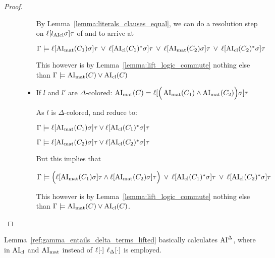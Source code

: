 \documentclass[,%
	paper=a4,%
	DIV14, %
	twoside=false,%
	liststotoc,
	bibtotoc,
	draft=false,%
	numbers=noendperiod
]{scrartcl}
\begin{document}
\begin{proof}
\begin{description}
\begin{itemize}
					By Lemma~\ref{lemma:literals_clauses_equal}, we can do a resolution step on $\ell[l_{\operatorname{AIcl}}\sigma]\tau$ of \markA{} and \markB{} to arrive at 

					$\Gamma \models \ell[\operatorname{AI}_\mathrm{mat}(C_1)\sigma]\tau \;\,{\lor}\;\, \ell[\operatorname{AI}_\mathrm{cl}(C_1)^*\sigma]\tau\;\,{\lor}\;\, 
					\ell[\operatorname{AI}_\mathrm{mat}(C_2)\sigma]\tau\;\,{\lor}\;\, \ell[\operatorname{AI}_\mathrm{cl}(C_2)^*\sigma]\tau $

					This however is by Lemma~\ref{lemma:lift_logic_commute} nothing else than
					$\Gamma \models \operatorname{AI}_\mathrm{mat}(C) \lor \operatorname{AI}_\mathrm{cl}(C)$

				\item If $l$ and $l'$ are $\Delta$-colored:
					$\operatorname{AI}_\mathrm{mat}(C) = \ell[\Big(\operatorname{AI}_\mathrm{mat}(C_1) \land \operatorname{AI}_\mathrm{mat}(C_2)\Big)\sigma] \tau$

					As $l$ is $\Delta$-colored, \markA{} and \markB{} reduce to:

					$\Gamma \models \ell[\operatorname{AI}_\mathrm{mat}(C_1)\sigma]\tau \lor \ell[\operatorname{AI}_\mathrm{cl}(C_1)^*\sigma]\tau$

					$\Gamma \models \ell[\operatorname{AI}_\mathrm{mat}(C_2)\sigma]\tau \lor \ell[\operatorname{AI}_\mathrm{cl}(C_2)^*\sigma]\tau$

					But this implies that 

					$\Gamma \models \Big(\ell[\operatorname{AI}_\mathrm{mat}(C_1)\sigma]\tau \land \ell[\operatorname{AI}_\mathrm{mat}(C_2)\sigma]\tau\Big) 
					\;\,{\lor}\;\, \ell[\operatorname{AI}_\mathrm{cl}(C_1)^*\sigma]\tau
					\;\,{\lor}\;\, \ell[\operatorname{AI}_\mathrm{cl}(C_2)^*\sigma]\tau$

					This however is by Lemma~\ref{lemma:lift_logic_commute} nothing else than 
					$\Gamma \models \operatorname{AI}_\mathrm{mat}(C) \lor \operatorname{AI}_\mathrm{cl}(C)$.
					\qedhere
			\end{itemize}

	\end{description}
\end{proof}

\begin{conj}
	Lemma~\ref{ref:gamma_entails_delta_terms_lifted} basically calculates $\operatorname{AI}^\Delta$, where in $\operatorname{AI}_\mathrm{cl}$ and $\operatorname{AI}_\mathrm{mat}$ instead of $\ell[\cdot]$ $\ell_{\Delta}[\cdot]$ is employed.
\end{conj}
\end{document}
